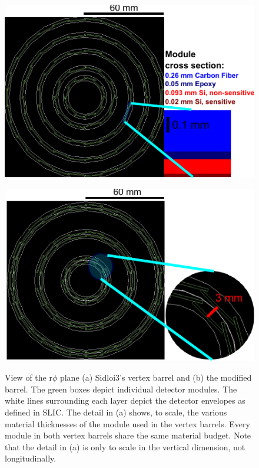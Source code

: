 \begin{figure}
\begin{minipage}{.5\textwidth}
\centering
\includegraphics{sidloi3_barrel_withVolumes.pdf}
\label{fig:sidloi3barrel}
\end{minipage}%
\begin{minipage}{.5\textwidth}
\centering
\includegraphics{DoubletVertexFinal_withVolumesAndDetail.pdf}
\label{fig:modifiedbarrel}
\end{minipage}
\caption{View of the r$\phi$ plane (a) Sidloi3's vertex barrel and
(b) the modified barrel. The green boxes depict
individual detector modules. The white lines surrounding each layer depict the detector envelopes as defined 
in SLIC. The detail in (a) shows, to scale, the various material
thicknesses of the module used in the vertex barrels. Every module in both vertex barrels
share the same material budget. Note that the detail in (a) is only to scale in the vertical dimension, not longitudinally.}
\label{fig:barrels}
\end{figure}
